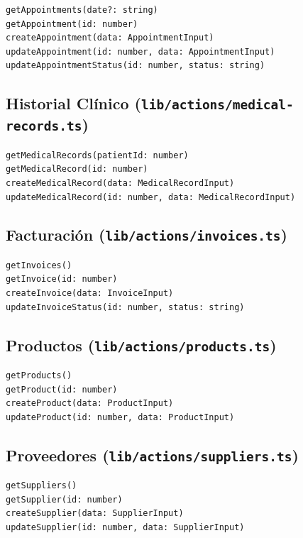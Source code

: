 \begin{lstlisting}[style=typescript]
getAppointments(date?: string)
getAppointment(id: number)
createAppointment(data: AppointmentInput)
updateAppointment(id: number, data: AppointmentInput)
updateAppointmentStatus(id: number, status: string)
\end{lstlisting}

\subsection{Historial Cl\'inico (\texttt{lib/actions/medical-records.ts})}

\begin{lstlisting}[style=typescript]
getMedicalRecords(patientId: number)
getMedicalRecord(id: number)
createMedicalRecord(data: MedicalRecordInput)
updateMedicalRecord(id: number, data: MedicalRecordInput)
\end{lstlisting}

\subsection{Facturaci\'on (\texttt{lib/actions/invoices.ts})}

\begin{lstlisting}[style=typescript]
getInvoices()
getInvoice(id: number)
createInvoice(data: InvoiceInput)
updateInvoiceStatus(id: number, status: string)
\end{lstlisting}

\subsection{Productos (\texttt{lib/actions/products.ts})}

\begin{lstlisting}[style=typescript]
getProducts()
getProduct(id: number)
createProduct(data: ProductInput)
updateProduct(id: number, data: ProductInput)
\end{lstlisting}

\subsection{Proveedores (\texttt{lib/actions/suppliers.ts})}

\begin{lstlisting}[style=typescript]
getSuppliers()
getSupplier(id: number)
createSupplier(data: SupplierInput)
updateSupplier(id: number, data: SupplierInput)
\end{lstlisting}

